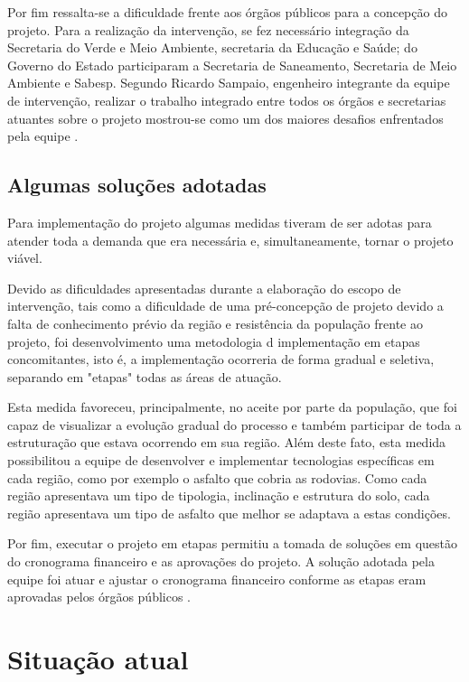 	Por fim ressalta-se a dificuldade frente aos órgãos públicos para a concepção do projeto. Para a realização da intervenção, se fez necessário integração da Secretaria do Verde e Meio Ambiente, secretaria da Educação e Saúde; do Governo do Estado participaram a Secretaria de Saneamento, Secretaria de Meio Ambiente e Sabesp. Segundo Ricardo Sampaio, engenheiro integrante da equipe de intervenção, realizar o trabalho integrado entre todos os órgãos e secretarias atuantes sobre o projeto mostrou-se como um dos maiores desafios enfrentados pela equipe \cite{Barda2012}.
	
	\section{Algumas soluções adotadas}
	
	Para implementação do projeto algumas medidas tiveram de ser adotas para atender toda a demanda que era necessária e, simultaneamente, tornar o projeto viável.
	
	Devido as dificuldades apresentadas durante a elaboração do escopo de intervenção, tais como a dificuldade de uma pré-concepção de projeto devido a falta de conhecimento prévio da região e resistência da população frente ao projeto, foi desenvolvimento uma metodologia d implementação em etapas concomitantes, isto é, a implementação ocorreria de forma gradual e seletiva, separando em "etapas" todas as áreas de atuação.
	
	Esta medida favoreceu, principalmente, no aceite por parte da população, que foi capaz de visualizar a evolução gradual do processo e também participar de toda a estruturação que estava ocorrendo em sua região. Além deste fato, esta medida possibilitou a equipe de desenvolver e implementar tecnologias específicas em cada região, como por exemplo o asfalto que cobria as rodovias. Como cada região apresentava um tipo de tipologia, inclinação e estrutura do solo, cada região apresentava um tipo de asfalto que melhor se adaptava a estas condições.
	
	Por fim, executar o projeto em etapas permitiu a tomada de soluções em questão do cronograma financeiro e as aprovações do projeto. A solução adotada pela equipe foi atuar e ajustar o cronograma financeiro conforme as etapas eram aprovadas pelos órgãos públicos \cite{Barda2012}.
	
	
	\chapter{Situação atual}
	
